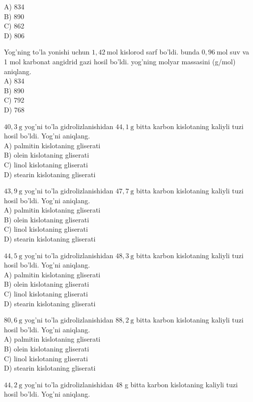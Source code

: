 A) 834\\
B) 890\\
C) 862\\
D) 806
  \item Yog'ning to'la yonishi uchun $1,42 \mathrm{~mol}$ kislorod sarf bo'ldi. bunda $0,96 \mathrm{~mol}$ suv va 1 mol karbonat angidrid gazi hosil bo'ldi. yog'ning molyar massasini (g/mol) aniqlang.\\
A) 834\\
B) 890\\
C) 792\\
D) 768
  \item $40,3 \mathrm{~g}$ yog'ni to'la gidrolizlanishidan $44,1 \mathrm{~g}$ bitta karbon kislotaning kaliyli tuzi hosil bo'ldi. Yog'ni aniqlang.\\
A) palmitin kislotaning gliserati\\
B) olein kislotaning gliserati\\
C) linol kislotaning gliserati\\
D) stearin kislotaning gliserati
  \item $43,9 \mathrm{~g}$ yog'ni to'la gidrolizlanishidan $47,7 \mathrm{~g}$ bitta karbon kislotaning kaliyli tuzi hosil bo'ldi. Yog'ni aniqlang.\\
A) palmitin kislotaning gliserati\\
B) olein kislotaning gliserati\\
C) linol kislotaning gliserati\\
D) stearin kislotaning gliserati
  \item $44,5 \mathrm{~g}$ yog'ni to'la gidrolizlanishidan $48,3 \mathrm{~g}$ bitta karbon kislotaning kaliyli tuzi hosil bo'ldi. Yog'ni aniqlang.\\
A) palmitin kislotaning gliserati\\
B) olein kislotaning gliserati\\
C) linol kislotaning gliserati\\
D) stearin kislotaning gliserati
  \item $80,6 \mathrm{~g}$ yog'ni to'la gidrolizlanishidan $88,2 \mathrm{~g}$ bitta karbon kislotaning kaliyli tuzi hosil bo'ldi. Yog'ni aniqlang.\\
A) palmitin kislotaning gliserati\\
B) olein kislotaning gliserati\\
C) linol kislotaning gliserati\\
D) stearin kislotaning gliserati
  \item $44,2 \mathrm{~g}$ yog'ni to'la gidrolizlanishidan 48 g bitta karbon kislotaning kaliyli tuzi hosil bo'ldi. Yog'ni aniqlang.\\
